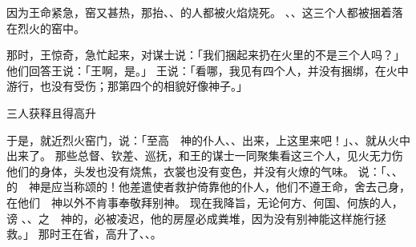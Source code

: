 {因为王命紧急，窑又甚热，那抬{}、{}、{}的人都被火焰烧死。
、{}、{}这三个人都被捆着落在烈火的窑中。
\par }{\PP {}那时，{}王惊奇，急忙起来，对谋士说：「我们捆起来扔在火里的不是三个人吗？」他们回答王说：「王啊，是。」
王说：「看哪，我见有四个人，并没有捆绑，在火中游行，也没有受伤；那第四个的相貌好像神子。」
\par }{\SH 三人获释且得高升
\par }{\PP {}于是，{}就近烈火窑门，说：「至高　神的仆人{}、{}、{}出来，上这里来吧！」{}、{}、{}就从火中出来了。
那些总督、钦差、巡抚，和王的谋士一同聚集看这三个人，见火无力伤他们的身体，头发也没有烧焦，衣裳也没有变色，并没有火燎的气味。
说：「{}、{}、{}的　神是应当称颂的！他差遣使者救护倚靠他的仆人，他们不遵王命，舍去己身，在他们　神以外不肯事奉敬拜别神。
现在我降旨，无论何方、何国、何族的人，谤
{}、{}、{}之　神的，必被凌迟，他的房屋必成粪堆，因为没有别神能这样施行拯救。」
那时王在{}省，高升了{}、{}、{}。

}
